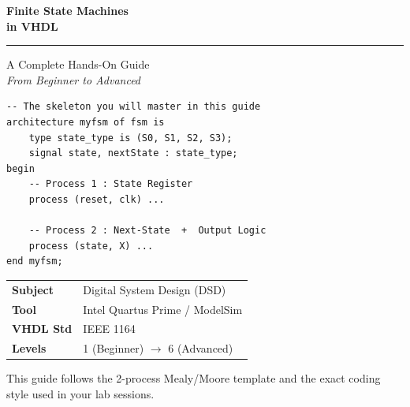 \documentclass[12pt,a4paper]{article}
\begin{document}
\begin{titlepage}
  \centering
  \vspace*{2cm}

  {\Huge\bfseries\sffamily\color{accentblue}
    Finite State Machines\\\medskip
    \large in VHDL}

  \vspace{0.5cm}
  \noindent\rule{0.8\linewidth}{1.5pt}
  \vspace{0.5cm}

  {\large\sffamily A Complete Hands-On Guide\\
  \textit{From Beginner to Advanced}}

  \vspace{1.5cm}

  \begin{tcolorbox}[colback=vhdlbg, colframe=accentblue!60!black,
      arc=8pt, width=0.85\linewidth]
    \lstset{style=vhdlstyle, numbers=none}
    \begin{lstlisting}
-- The skeleton you will master in this guide
architecture myfsm of fsm is
    type state_type is (S0, S1, S2, S3);
    signal state, nextState : state_type;
begin
    -- Process 1 : State Register
    process (reset, clk) ...

    -- Process 2 : Next-State  +  Output Logic
    process (state, X) ...
end myfsm;
    \end{lstlisting}
  \end{tcolorbox}

  \vspace{1.5cm}

  \begin{tabular}{ll}
    \toprule
    \textbf{Subject}  & Digital System Design (DSD) \\
    \textbf{Tool}     & Intel Quartus Prime / ModelSim \\
    \textbf{VHDL Std} & IEEE 1164 \\
    \textbf{Levels}   & 1 (Beginner) $\rightarrow$ 6 (Advanced) \\
    \bottomrule
  \end{tabular}

  \vfill
  {\small\color{gray} This guide follows the 2-process Mealy/Moore template
   and the exact coding style used in your lab sessions.}
\end{titlepage}

\tableofcontents
\newpage
\end{document}
